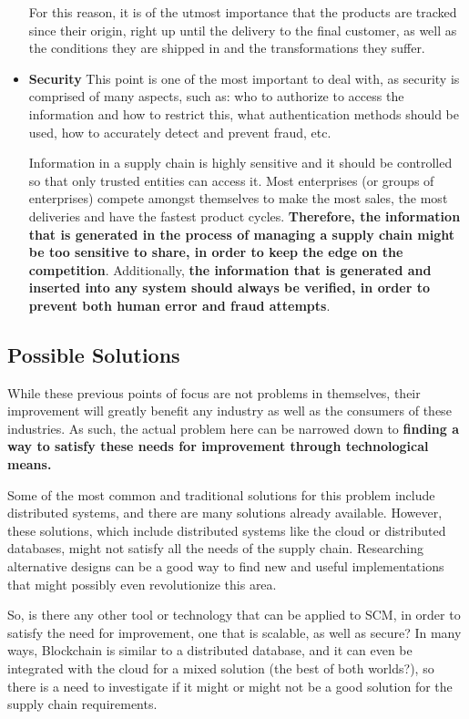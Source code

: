 \begin{itemize}
For this reason, it is of the utmost importance that the products are tracked since their origin, right up until the delivery to the final customer, as well as the conditions they are shipped in and the transformations they suffer.

\item \textbf{Security}
This point is one of the most important to deal with, as security is comprised of many aspects, such as: who to authorize to access the information and how to restrict this, what authentication methods should be used, how to accurately detect and prevent fraud, etc. 

Information in a supply chain is highly sensitive and it should be controlled so that only trusted entities can access it. Most enterprises (or groups of enterprises) compete amongst themselves to make the most sales, the most deliveries and have the fastest product cycles. \textbf{Therefore, the information that is generated in the process of managing a supply chain might be too sensitive to share, in order to keep the edge on the competition}.
Additionally, \textbf{the information that is generated and inserted into any system should always be verified, in order to prevent both human error and fraud attempts}.

\end{itemize}

\subsection{Possible Solutions}
While these previous points of focus are not problems in themselves, their improvement will greatly benefit any industry as well as the consumers of these industries. As such, the actual problem here can be narrowed down to \textbf{finding a way to satisfy these needs for improvement through technological means.}

Some of the most common and traditional solutions for this problem include distributed systems, and there are many solutions already available. However, these solutions, which include distributed systems like the cloud or distributed databases, might not satisfy all the needs of the supply chain. Researching alternative designs can be a good way to find new and useful implementations that might possibly even revolutionize this area.

So, is there any other tool or technology that can be applied to SCM, in order to satisfy the need for improvement, one that is scalable, as well as secure?
In many ways, Blockchain is similar to a distributed database, and it can even be integrated with the cloud for a mixed solution (the best of both worlds?), so there is a need to investigate if it might or might not be a good solution for the supply chain requirements.


